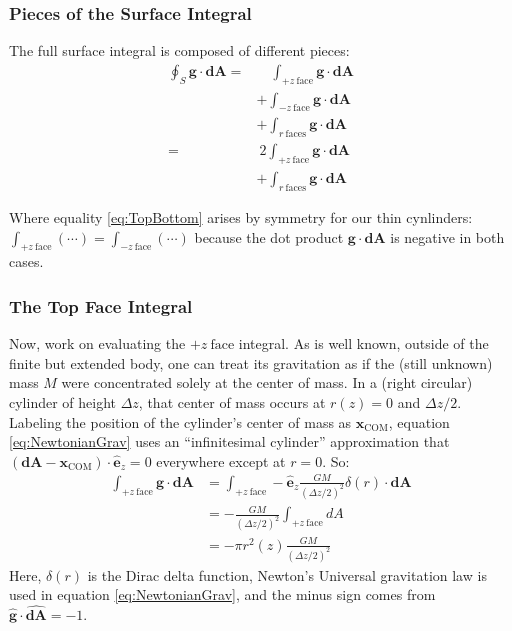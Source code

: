 \documentclass[aspectratio=43,serif,9pt]{beamer}
\newcommand{\vect}[1]{\boldsymbol{#1}}
\begin{document}
\begin{frame}
  \frametitle{Pieces of the Surface Integral}

  The full surface integral is composed of different pieces:
  \begin{subequations}
  \begin{align}
    \oint_{S} \vect{g} \cdot  \vect{dA} = &\quad \int_{+z~\mathrm{face}} \vect{g} \cdot  \vect{dA} \\
                                          &+ \int_{-z~\mathrm{face}} \vect{g} \cdot  \vect{dA} \nonumber \\
                                          &+ \int_{r~\mathrm{faces}} \vect{g} \cdot  \vect{dA} \nonumber \\
    = &~2\int_{+z~\mathrm{face}} \vect{g} \cdot  \vect{dA}  \label{eq:TopBottom} \\
    &+ \int_{r~\mathrm{faces}} \vect{g} \cdot  \vect{dA} \nonumber
  \end{align}
  \end{subequations}


  Where equality \eqref{eq:TopBottom} arises by symmetry for our thin cynlinders: $\int_{+z~\mathrm{face}}(\cdots) = \int_{-z~\mathrm{face}}(\cdots)$ because the dot product $\vect{g} \cdot \vect{dA}$ is negative in both cases.
\end{frame}

\begin{frame}
  \frametitle{The Top Face Integral}

  Now, work on evaluating the $+z~\mathrm{face}$ integral. As is well known, outside of the finite but extended body,
  one can treat its gravitation as if the (still unknown) mass $M$ were concentrated solely at the center of mass. In a (right circular)
  cylinder of height $\Delta z$, that center of mass occurs at $r(z)=0$ and $\Delta z/2$. Labeling the
  position of the cylinder's center of mass as $\vect{x}_\mathrm{COM}$, equation \eqref{eq:NewtonianGrav} uses an
  ``infinitesimal cylinder''  approximation that $(\vect{dA} - \vect{x}_\mathrm{COM}) \cdot \vect{\hat{e}}_z = 0$ everywhere except at $r=0$.
    So:
  \begin{align}
    \int_{+z~\mathrm{face}} \vect{g} \cdot  \vect{dA} &= \int_{+z~\mathrm{face}} -\vect{\hat{e}}_z \frac{GM}{(\Delta z / 2)^2}  \delta(r) \cdot \vect{dA} \label{eq:NewtonianGrav} \\
                                                   &= -\frac{GM}{(\Delta z / 2)^2} \int_{+z~\mathrm{face}} dA \nonumber\\
                                                   &=   -\pi r^2(z) \frac{GM}{(\Delta z / 2)^2} \label{eq:TopFaceIntegral}
  \end{align}
  Here, $\delta(r)$ is the Dirac delta function, Newton's Universal gravitation law is used in equation \eqref{eq:NewtonianGrav}, and the minus sign comes from $\hat{\vect{g}} \cdot \widehat{\vect{dA}} = -1$.
\end{frame}
\end{document}
